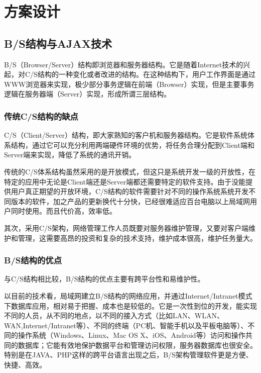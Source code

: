 
\chapter{方案设计}
\section{B/S结构与AJAX技术}

B/S（Browser/Server）结构即浏览器和服务器结构。它是随着Internet技术的兴起，对C/S结构的一种变化或者改进的结构。在这种结构下，用户工作界面是通过WWW浏览器来实现，极少部分事务逻辑在前端（Browser）实现，但是主要事务逻辑在服务器端（Server）实现，形成所谓三层结构。

\subsection{传统C/S结构的缺点}
C/S（Client/Server）结构，即大家熟知的客户机和服务器结构。它是软件系统体系结构，通过它可以充分利用两端硬件环境的优势，将任务合理分配到Client端和Server端来实现，降低了系统的通讯开销。

传统的C/S体系结构虽然采用的是开放模式，但这只是系统开发一级的开放性，在特定的应用中无论是Client端还是Server端都还需要特定的软件支持。由于没能提供用户真正期望的开放环境，C/S结构的软件需要针对不同的操作系统系统开发不同版本的软件，加之产品的更新换代十分快，已经很难适应百台电脑以上局域网用户同时使用。而且代价高，效率低。

其次，采用C/S架构，网络管理工作人员既要对服务器维护管理，又要对客户端维护和管理，这需要高昂的投资和复杂的技术支持，维护成本很高，维护任务量大。

\subsection{B/S结构的优点}
与C/S结构相比较，B/S结构的优点主要有跨平台性和易维护性。

以目前的技术看，局域网建立B/S结构的网络应用，并通过Internet/Intranet模式下数据库应用，相对易于把握、成本也是较低的。它是一次性到位的开发，能实现不同的人员，从不同的地点，以不同的接入方式（比如LAN、WLAN、WAN,Internet/Intranet等）、不同的终端（PC机、智能手机以及平板电脑等）、不同的操作系统（Windows、Linux、Mac OS X、iOS、Android等）访问和操作共同的数据库；它能有效地保护数据平台和管理访问权限，服务器数据库也很安全。特别是在JAVA、PHP这样的跨平台语言出现之后，B/S架构管理软件更是方便、快捷、高效。

